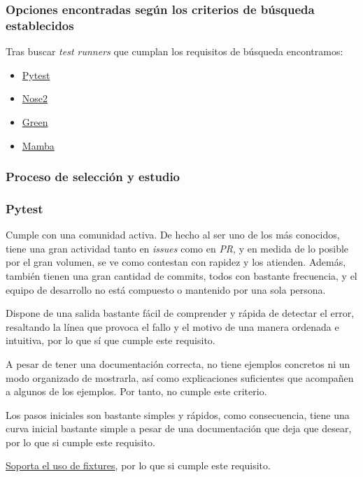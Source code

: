 \subsubsection{Opciones encontradas según los criterios de búsqueda establecidos}

Tras buscar \emph{test runners} que cumplan los requisitos de búsqueda encontramos:

\begin{itemize}
    \item \href{https://github.com/pytest-dev/pytest}{Pytest}
    \item \href{https://github.com/nose-devs/nose2}{Nose2}
    \item \href{https://github.com/CleanCut/green}{Green}
    \item \href{https://github.com/nestorsalceda/mamba}{Mamba}
\end{itemize}

\subsubsection{Proceso de selección y estudio}

\subsubsection{Pytest}

\begin{todolist}
    \item[\xcmark] Cumple con una comunidad activa. De hecho al ser uno de los
    más conocidos, tiene una gran actividad tanto en \emph{issues} como en
    \emph{PR}, y en medida de lo posible por el gran volumen, se ve como
    contestan con rapidez y los atienden. Además, también tienen una gran
    cantidad de commits, todos con bastante frecuencia, y el equipo de
    desarrollo no está compuesto o mantenido por una sola persona.
    \item[\xcmark] Dispone de una salida bastante fácil de comprender y rápida
    de detectar el error, resaltando la línea que provoca el fallo y el motivo
    de una manera ordenada e intuitiva, por lo que sí que cumple este requisito.
    \item A pesar de tener una documentación correcta, no tiene ejemplos
    concretos ni un modo organizado de mostrarla, así como explicaciones
    suficientes que acompañen a algunos de los ejemplos. Por tanto, no cumple
    este criterio.
    \item[\xcmark] Los pasos iniciales son bastante simples y rápidos, como
    consecuencia, tiene una curva inicial bastante simple a pesar de una
    documentación que deja que desear, por lo que si cumple este requisito.
    \item[\xcmark]
    \href{https://docs.pytest.org/en/latest/explanation/fixtures.html}{Soporta
    el uso de fixtures}, por lo que si cumple este requisito. 
\end{todolist}


